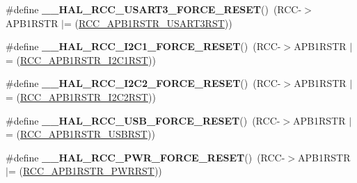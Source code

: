 \begin{DoxyCompactItemize}
\item 
\hypertarget{group___r_c_c___a_p_b1___force___release___reset_ga8902e16d49b4335d213b6a115c19127b}{\#define {\bfseries \-\_\-\-\_\-\-H\-A\-L\-\_\-\-R\-C\-C\-\_\-\-U\-S\-A\-R\-T3\-\_\-\-F\-O\-R\-C\-E\-\_\-\-R\-E\-S\-E\-T}()~(R\-C\-C-\/$>$A\-P\-B1\-R\-S\-T\-R $\vert$= (\hyperlink{group___peripheral___registers___bits___definition_ga766478ebdcbb647eb3f32962543bd194}{R\-C\-C\-\_\-\-A\-P\-B1\-R\-S\-T\-R\-\_\-\-U\-S\-A\-R\-T3\-R\-S\-T}))}\label{group___r_c_c___a_p_b1___force___release___reset_ga8902e16d49b4335d213b6a115c19127b}

\item 
\hypertarget{group___r_c_c___a_p_b1___force___release___reset_ga551c171f88af86ca985db634ac9e3275}{\#define {\bfseries \-\_\-\-\_\-\-H\-A\-L\-\_\-\-R\-C\-C\-\_\-\-I2\-C1\-\_\-\-F\-O\-R\-C\-E\-\_\-\-R\-E\-S\-E\-T}()~(R\-C\-C-\/$>$A\-P\-B1\-R\-S\-T\-R $\vert$= (\hyperlink{group___peripheral___registers___bits___definition_gadcd25346a7d7b0009090adfbca899b93}{R\-C\-C\-\_\-\-A\-P\-B1\-R\-S\-T\-R\-\_\-\-I2\-C1\-R\-S\-T}))}\label{group___r_c_c___a_p_b1___force___release___reset_ga551c171f88af86ca985db634ac9e3275}

\item 
\hypertarget{group___r_c_c___a_p_b1___force___release___reset_gaed404dfdc9bc032cf718b7ed17f664f0}{\#define {\bfseries \-\_\-\-\_\-\-H\-A\-L\-\_\-\-R\-C\-C\-\_\-\-I2\-C2\-\_\-\-F\-O\-R\-C\-E\-\_\-\-R\-E\-S\-E\-T}()~(R\-C\-C-\/$>$A\-P\-B1\-R\-S\-T\-R $\vert$= (\hyperlink{group___peripheral___registers___bits___definition_ga412d59407e5dad43cf8ae1ea6f8bc5c3}{R\-C\-C\-\_\-\-A\-P\-B1\-R\-S\-T\-R\-\_\-\-I2\-C2\-R\-S\-T}))}\label{group___r_c_c___a_p_b1___force___release___reset_gaed404dfdc9bc032cf718b7ed17f664f0}

\item 
\hypertarget{group___r_c_c___a_p_b1___force___release___reset_ga3d05fde29c4ac7d73fea2b1a107b28bc}{\#define {\bfseries \-\_\-\-\_\-\-H\-A\-L\-\_\-\-R\-C\-C\-\_\-\-U\-S\-B\-\_\-\-F\-O\-R\-C\-E\-\_\-\-R\-E\-S\-E\-T}()~(R\-C\-C-\/$>$A\-P\-B1\-R\-S\-T\-R $\vert$= (\hyperlink{group___peripheral___registers___bits___definition_ga51baa4f973f66eb9781d690fa061f97f}{R\-C\-C\-\_\-\-A\-P\-B1\-R\-S\-T\-R\-\_\-\-U\-S\-B\-R\-S\-T}))}\label{group___r_c_c___a_p_b1___force___release___reset_ga3d05fde29c4ac7d73fea2b1a107b28bc}

\item 
\hypertarget{group___r_c_c___a_p_b1___force___release___reset_gaf454341fae45fdfacfea2f45c07ce3e0}{\#define {\bfseries \-\_\-\-\_\-\-H\-A\-L\-\_\-\-R\-C\-C\-\_\-\-P\-W\-R\-\_\-\-F\-O\-R\-C\-E\-\_\-\-R\-E\-S\-E\-T}()~(R\-C\-C-\/$>$A\-P\-B1\-R\-S\-T\-R $\vert$= (\hyperlink{group___peripheral___registers___bits___definition_ga274d8cb48f0e89831efabea66d64af2a}{R\-C\-C\-\_\-\-A\-P\-B1\-R\-S\-T\-R\-\_\-\-P\-W\-R\-R\-S\-T}))}\label{group___r_c_c___a_p_b1___force___release___reset_gaf454341fae45fdfacfea2f45c07ce3e0}


\end{DoxyCompactItemize}
